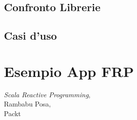 \documentclass[12pt]{article}
\begin{document}
\subsection{Confronto Librerie}
\subsection{Casi d'uso}

\newpage
\section{Esempio App FRP}

\newpage
{}
\begin{thebibliography}{4}

\textit{Scala Reactive Programming}, \\ Rambabu Posa, \\ Packt



\end{thebibliography}
\end{document}
